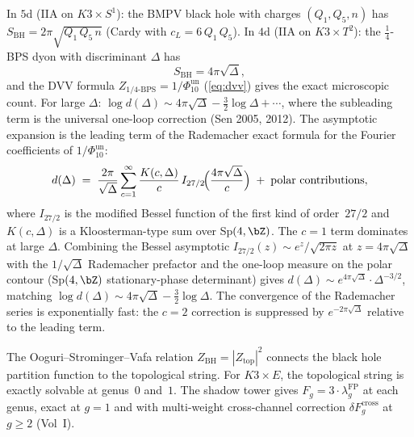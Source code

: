 \begin{proposition}
\label{prop:bmpv}
In $5$d \textup{(}IIA on $K3 \times S^1$\textup{)}: the BMPV black hole
with charges $(Q_1, Q_5, n)$ has
$S_{\mathrm{BH}} = 2\pi\sqrt{Q_1\,Q_5\,n}$
\textup{(}Cardy with $c_L = 6\,Q_1\,Q_5$\textup{)}.
In $4$d \textup{(}IIA on $K3 \times T^2$\textup{)}: the
$\frac{1}{4}$-BPS dyon with discriminant $\Delta$ has
\[
S_{\mathrm{BH}} = 4\pi\sqrt{\Delta},
\]
and the DVV formula \(Z_{1/4\text{-BPS}} = 1/\Phi_{10}^{\mathrm{un}}\)
\textup{(}\eqref{eq:dvv}\textup{)} gives the exact microscopic count.
For large $\Delta$:
$\log d(\Delta) \sim 4\pi\sqrt{\Delta} -
\frac{3}{2}\log\Delta + \cdots$,
where the subleading term is the universal one-loop correction
\textup{(}Sen 2005, 2012\textup{)}.
The asymptotic expansion is the leading term of the Rademacher
exact formula for the Fourier coefficients of \(1/\Phi_{10}^{\mathrm{un}}\):
\[
d(\Delta) \;=\; \frac{2\pi}{\sqrt{\Delta}}
\sum_{c=1}^{\infty} \frac{K(c,\Delta)}{c}\,
I_{27/2}\!\Bigl(\frac{4\pi\sqrt{\Delta}}{c}\Bigr)
\;+\; \text{polar contributions},
\]
where $I_{27/2}$ is the modified Bessel function of the first
kind of order~$27/2$ and $K(c,\Delta)$ is a Kloosterman-type
sum over Sp$(4,\bZ)$. The $c = 1$ term dominates at large
$\Delta$. Combining the Bessel asymptotic
$I_{27/2}(z) \sim e^z/\sqrt{2\pi z}$ at $z = 4\pi\sqrt{\Delta}$
with the $1/\sqrt{\Delta}$ Rademacher prefactor and the
one-loop measure on the polar contour
\textup{(}Sp$(4,\bZ)$ stationary-phase determinant\textup{)} gives
$d(\Delta) \sim e^{4\pi\sqrt{\Delta}} \cdot \Delta^{-3/2}$,
matching $\log d(\Delta) \sim 4\pi\sqrt{\Delta}
- \tfrac{3}{2}\log\Delta$.
The convergence of the Rademacher series is exponentially fast:
the $c = 2$ correction is suppressed by $e^{-2\pi\sqrt{\Delta}}$
relative to the leading term.
\end{proposition}

\begin{remark}
\label{rem:osv}
The Ooguri--Strominger--Vafa relation
$Z_{\mathrm{BH}} = |Z_{\mathrm{top}}|^2$ connects the black hole
partition function to the topological string. For $K3 \times E$,
the topological string is exactly solvable at genus~$0$ and~$1$.
The shadow tower gives $F_g = 3 \cdot \lambda_g^{\mathrm{FP}}$
at each genus, exact at $g = 1$ and with multi-weight
cross-channel correction $\delta F_g^{\mathrm{cross}}$ at
$g \geq 2$ \textup{(Vol~I)}.
\end{remark}



